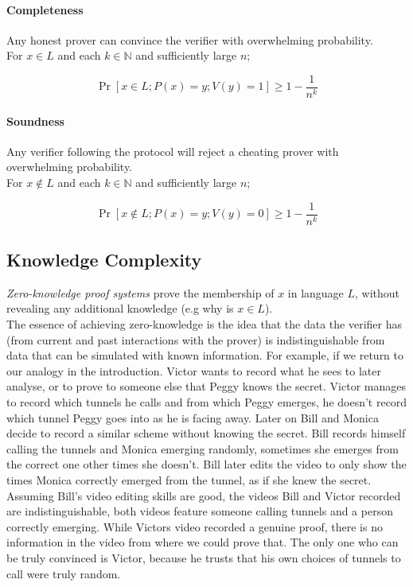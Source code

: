 \paragraph{Completeness}

Any honest prover can convince the verifier with overwhelming probability.\\
For $x \in L$ and each $k \in \mathbb{N}$ and sufficiently large $n$;

$$\Pr[x \in L; P(x) = y; V(y) = 1] \ge 1 - \frac{1}{n^k}$$

\paragraph{Soundness}

Any verifier following the protocol will reject a cheating prover with overwhelming probability.\\
For $x \notin L$ and each $k \in \mathbb{N}$ and sufficiently large $n$;

$$\Pr[x \notin L; P(x) = y; V(y) = 0] \ge 1 - \frac{1}{n^k}$$

\subsection{Knowledge Complexity}

\textit{Zero-knowledge proof systems} prove the  membership of $x$ in language $L$, without revealing any additional knowledge (e.g why is $x \in L$).\\
The essence of achieving zero-knowledge is the idea that the data the verifier has (from current and past interactions with the prover) is indistinguishable from data that can be simulated with known information.
For example, if we return to our analogy in the introduction. 
Victor wants to record what he sees to later analyse, or to prove to someone else that Peggy knows the secret.
Victor manages to record which tunnels he calls and from which Peggy emerges, he doesn't record which tunnel Peggy goes into as he is facing away.
Later on Bill and Monica decide to record a similar scheme without knowing the secret.
Bill records himself calling the tunnels and Monica emerging randomly, sometimes she emerges from the correct one other times she doesn't. 
Bill later edits the video to only show the times Monica correctly emerged from the tunnel, as if she knew the secret.
Assuming Bill's video editing skills are good, the videos Bill and Victor recorded are indistinguishable, both videos feature someone calling tunnels and a person correctly emerging. 
While Victors video recorded a genuine proof, there is no information in the video from where we could prove that.
The only one who can be truly convinced is Victor, because he trusts that his own choices of tunnels to call were truly random.


